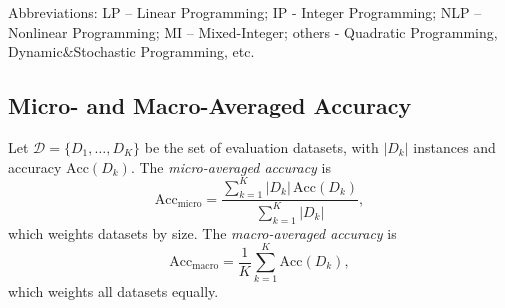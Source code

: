 \documentclass[sigconf, nonacm]{acmart}
\begin{document}
\begin{table}[t]
  \centering
  \caption{Statistics of the optimization problem datasets}
  \label{table:datasets}
  \vspace{0.5ex}

  \footnotesize
  Abbreviations:  
  LP – Linear Programming;  
  IP - Integer Programming;
  NLP – Nonlinear Programming;  
  MI – Mixed-Integer;  
  others - Quadratic Programming, Dynamic\&Stochastic Programming, etc.
\end{table}

\subsection{Micro- and Macro-Averaged Accuracy\label{appendix:metrics}}
Let $\mathcal{D}=\{D_1,\dots,D_K\}$ be the set of evaluation datasets, with $|D_k|$ instances and accuracy $\mathrm{Acc}(D_k)$. The \emph{micro-averaged accuracy} is
\[
\mathrm{Acc}_{\text{micro}}=\frac{\sum_{k=1}^{K} |D_k|\,\mathrm{Acc}(D_k)}{\sum_{k=1}^{K} |D_k|},
\]
which weights datasets by size. The \emph{macro-averaged accuracy} is
\[
\mathrm{Acc}_{\text{macro}}=\frac{1}{K}\sum_{k=1}^{K}\mathrm{Acc}(D_k),
\]
which weights all datasets equally.
\end{document}

